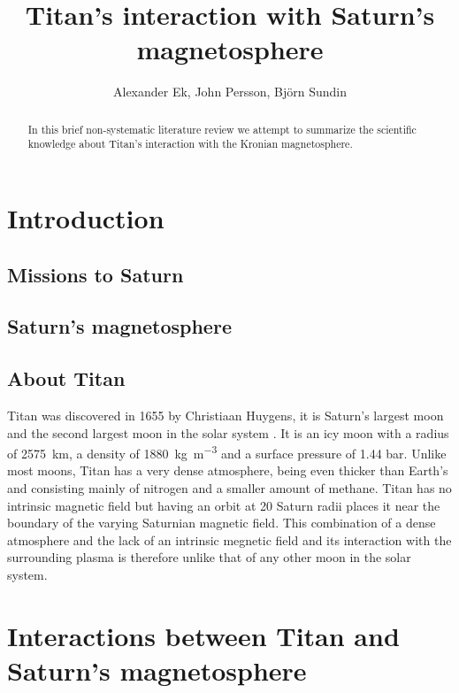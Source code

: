\documentclass[12pt, parskip=full*, abstract]{scrartcl}
\title{Titan's interaction with Saturn's magnetosphere}
\author{Alexander Ek, John Persson, Björn Sundin}
\begin{document}
\maketitle
\vspace{5mm}
\begin{abstract}
	In this brief non-systematic literature review we attempt to summarize the scientific knowledge about Titan's interaction with the Kronian magnetosphere.
\end{abstract}

\tableofcontents
\newpage

\section{Introduction}
\subsection{Missions to Saturn}

\subsection{Saturn's magnetosphere}

\subsection{About Titan}
Titan was discovered in 1655 by Christiaan Huygens, it is Saturn's largest moon and the second largest moon in the solar system \parencite{fundamental-planetary-science}. It is an icy moon with a radius of \SI{2575}{\kilo\metre}, a density of \SI{1880}{\kilogram\per\metre^3} and a surface pressure of 1.44 bar. Unlike most moons, Titan has a very dense atmosphere, being even thicker than Earth's and consisting mainly of nitrogen and a smaller amount of methane. Titan has no intrinsic magnetic field but having an orbit at 20 Saturn radii places it near the boundary of the varying Saturnian magnetic field. This combination of a dense atmosphere and the lack of an intrinsic megnetic field and its interaction with the surrounding plasma is therefore unlike that of any other moon in the solar system. 


\section{Interactions between Titan and Saturn's magnetosphere}
\end{document}
